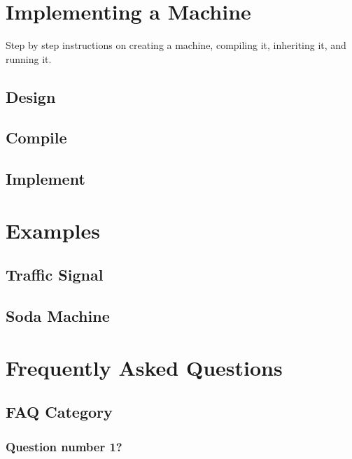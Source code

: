 \documentclass[titlepage,letterpaper]{report}
\begin{document}
\chapter{Implementing a Machine}

Step by step instructions on creating a machine, compiling it,
inheriting it, and running it.

\section{Design}


\section{Compile}


\section{Implement}




\chapter{Examples}

\section{Traffic Signal}

\section{Soda Machine}




\appendix






\chapter{Frequently Asked Questions}

\section{FAQ Category}

\subsection{Question number 1?}
\end{document}
